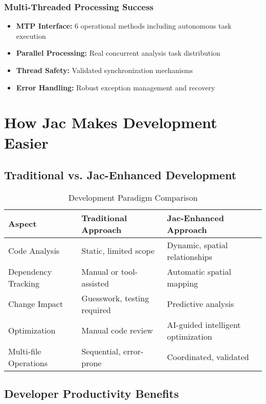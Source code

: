\documentclass[12pt,a4paper]{article}
\begin{document}
\subsubsection{Multi-Threaded Processing Success}
\begin{itemize}
    \item \textbf{MTP Interface:} 6 operational methods including autonomous task execution
    \item \textbf{Parallel Processing:} Real concurrent analysis task distribution
    \item \textbf{Thread Safety:} Validated synchronization mechanisms
    \item \textbf{Error Handling:} Robust exception management and recovery
\end{itemize}

\section{How Jac Makes Development Easier}

\subsection{Traditional vs. Jac-Enhanced Development}

\begin{table}[H]
\centering
\caption{Development Paradigm Comparison}
\begin{tabularx}{\textwidth}{|l|X|X|}
\hline
\textbf{Aspect} & \textbf{Traditional Approach} & \textbf{Jac-Enhanced Approach} \\
\hline
Code Analysis & Static, limited scope & Dynamic, spatial relationships \\
\hline
Dependency Tracking & Manual or tool-assisted & Automatic spatial mapping \\
\hline
Change Impact & Guesswork, testing required & Predictive analysis \\
\hline
Optimization & Manual code review & AI-guided intelligent optimization \\
\hline
Multi-file Operations & Sequential, error-prone & Coordinated, validated \\
\hline
\end{tabularx}
\end{table}

\subsection{Developer Productivity Benefits}
\end{document}
